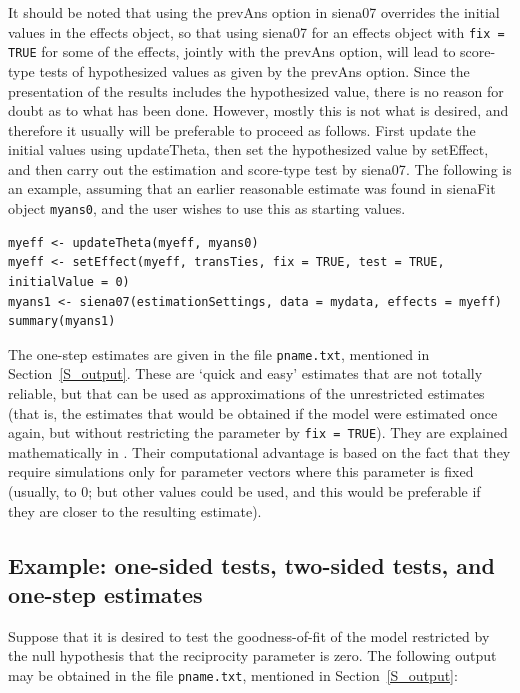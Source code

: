 \documentclass[a4paper,fleqn,11pt]{article}
\newcommand{\+}{\, + \,}
\newcommand{\sfn}[1]{\textsf{#1}}
\begin{document}
It should be noted that using the \sfn{prevAns} option in \textsf{siena07}
overrides the initial values in the effects object,
so that using \sfn{siena07} for an effects object with
\texttt{fix = TRUE} for some of the effects, jointly with
the \sfn{prevAns} option, will lead to score-type tests
of hypothesized values as given by the  \sfn{prevAns} option.
Since the presentation of the results includes the
hypothesized value, there is no reason for doubt as to what
has been done. However, mostly this is not what is desired,
and therefore it usually will be preferable to proceed as follows.
First update the initial values using \sfn{updateTheta}, then
set the hypothesized value by \sfn{setEffect}, and then
carry out the estimation and score-type test by \sfn{siena07}.
The following is an example, assuming that an earlier
reasonable estimate was found in \sfn{sienaFit} object \texttt{myans0},
and the user wishes to use this as starting values.
\begin{verbatim}
myeff <- updateTheta(myeff, myans0)
myeff <- setEffect(myeff, transTies, fix = TRUE, test = TRUE, initialValue = 0)
myans1 <- siena07(estimationSettings, data = mydata, effects = myeff)
summary(myans1)
\end{verbatim}


The one-step estimates are given in the file \texttt{pname.txt},
mentioned in Section~\ref{S_output}.
These are `quick and easy' estimates that are not totally
reliable, but that can be used as approximations of the unrestricted estimates
(that is, the estimates that would be obtained if the model were estimated
once again, but without restricting the parameter by \texttt{fix = TRUE}).
They are explained mathematically in \citet{Schweinberger12}.
Their computational advantage is based on the fact that they require simulations
only for parameter vectors where this parameter is fixed (usually, to 0;
but other values could be used, and this would be preferable if they are closer
to the resulting estimate).

\subsection{Example: one-sided tests, two-sided tests, and one-step estimates}
\label{example}

Suppose that it is desired to test the goodness-of-fit of the model
restricted by the null hypothesis that the reciprocity parameter is zero.
The following output may be obtained in the file \texttt{pname.txt},
mentioned in Section~\ref{S_output}:
\end{document}
